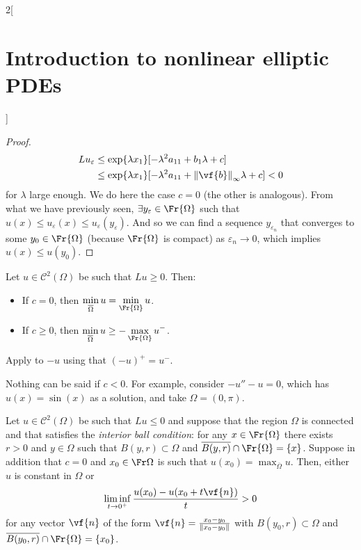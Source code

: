 \documentclass[../../../main_math.tex]{subfiles}
\begin{document}
\begin{multicols}{2}[\section{Introduction to nonlinear elliptic PDEs}]
\begin{proof}
    \begin{align*}
      Lu_\varepsilon & \leq \exp{\lambda x_1}[-\lambda^2a_{11}+b_1\lambda+c]                    \\
                     & \leq \exp{\lambda x_1}[-\lambda^2a_{11}+\norm{\vf{b}}_\infty\lambda+c]<0
    \end{align*}
    for $\lambda$ large enough. We do here the case $c=0$ (the other is analogous). From what we have previously seen, $\exists y_\varepsilon\in\Fr{\Omega}$ such that $u(x)\leq u_\varepsilon(x)\leq u_\varepsilon(y_\varepsilon)$. And so we can find a sequence $y_{\varepsilon_n}$ that converges to some $y_0\in\Fr{\Omega}$ (because $\Fr{\Omega}$ is compact) as $\varepsilon_n\to 0$, which implies $u(x)\leq u(y_0)$.
  \end{proof}
  \begin{theorem}
    Let $u\in \mathcal{C}^2(\Omega)$ be such that $Lu\geq 0$. Then:
    \begin{itemize}
      \item If $c=0$, then $\displaystyle \min_{\overline{\Omega}}u=\min_{\Fr{\Omega}}u$.
      \item If $c\geq 0$, then $\displaystyle \min_{\overline{\Omega}} u \geq -\max_{\Fr{\Omega}}u^-$.
    \end{itemize}
  \end{theorem}
  \begin{sproof}
    Apply  to $-u$ using that ${(-u)}^+=u^-$.
  \end{sproof}
  \begin{remark}
    Nothing can be said if $c<0$. For example, consider $-u''-u=0$, which has $u(x)=\sin(x)$ as a solution, and take $\Omega=(0,\pi)$.
  \end{remark}
  \begin{lemma}\label{INEPDE:Hopf}
    Let $u\in \mathcal{C}^2(\Omega)$ be such that $Lu\leq 0$ and suppose that the region $\Omega$ is connected and that satisfies the \emph{interior ball condition}: for any $x\in \Fr{\Omega}$ there exists $r>0$ and $y\in \Omega$ such that $B(y,r)\subset \Omega$ and $\overline{B(y,r)}\cap \Fr{\Omega}=\{x\}$. Suppose in addition that $c=0$ and $x_0\in\Fr\Omega$ is such that $\displaystyle u(x_0)=\max_{\overline{\Omega}}u$. Then, either $u$ is constant in $\Omega$ or
    $$
      \liminf_{t\to 0^+}\frac{u(x_0) - u(x_0+t\vf{n})}{t}>0
    $$
    for any vector $\vf{n}$ of the form $\vf{n}=\frac{x_0-y_0}{\norm{x_0-y_0}}$ with $B(y_0,r)\subset \Omega$ and $\overline{B(y_0,r)}\cap \Fr{\Omega}=\{x_0\}$.

\end{lemma}
\end{multicols}
\end{document}
